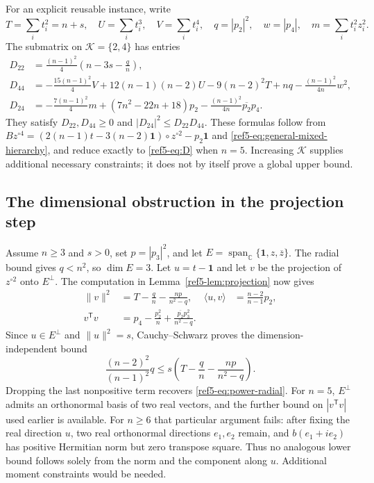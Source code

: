 \documentclass[11pt]{article}
\theoremstyle{remark}
\newcommand{\C}{\mathbb C}
\newcommand{\one}{\mathbf 1}
\newcommand{\norm}[1]{\lVert#1\rVert}
\newcommand{\ip}[2]{\langle#1,#2\rangle}
\numberwithin{equation}{section}
\begin{document}
For an explicit reusable instance, write
\[
 T=\sum_i t_i^2=n+s,\quad U=\sum_i t_i^3,\quad V=\sum_i t_i^4,
 \quad q=|p_2|^2,\quad w=|p_4|,\quad m=\sum_i t_i^2z_i^2.
\]
The submatrix on $\mathcal K=\{2,4\}$ has entries
\begin{equation}\label{ref5-eq:general-D24}
\begin{aligned}
 D_{22}&=\frac{(n-1)^2}{4}\left(n-3s-\frac qn\right),\\
 D_{44}&=-\frac{15(n-1)^2}{4}V+12(n-1)(n-2)U
       -9(n-2)^2T+nq-\frac{(n-1)^2}{4n}w^2,\\
 D_{24}&=-\frac{7(n-1)^2}{4}m+(7n^2-22n+18)p_2
       -\frac{(n-1)^2}{4n}\overline{p_2}p_4.
\end{aligned}
\end{equation}
They satisfy $D_{22},D_{44}\ge0$ and
$|D_{24}|^2\le D_{22}D_{44}$.
These formulas follow from
$Bz^{\circ4}=(2(n-1)t-3(n-2)\one)\circ z^{\circ2}-p_2\one$
and \eqref{ref5-eq:general-mixed-hierarchy}, and reduce exactly to
\eqref{ref5-eq:D} when $n=5$. Increasing $\mathcal K$ supplies additional
necessary constraints; it does not by itself prove a global upper bound.

\subsection{The dimensional obstruction in the projection step}
Assume $n\ge3$ and $s>0$, set $p=|p_3|^2$, and let
$E=\operatorname{span}_{\C}\{\one,z,\overline z\}$.
The radial bound gives $q<n^2$, so $\dim E=3$.
Let $u=t-\one$ and let $v$ be the projection of $z^{\circ2}$ onto
$E^\perp$. The computation in Lemma~\ref{ref5-lem:projection} now gives
\begin{equation}\label{ref5-eq:general-projection-identities}
\begin{aligned}
 \norm v^2&=T-\frac qn-\frac{np}{n^2-q},&
 \ip u v&=\frac{n-2}{n-1}p_2,\\
 v^{\mathsf T}v&=p_4-\frac{p_2^2}{n}
                  +\frac{\overline{p_2}p_3^2}{n^2-q}.
\end{aligned}
\end{equation}
Since $u\in E^\perp$ and $\norm u^2=s$, Cauchy--Schwarz proves the
dimension-independent bound
\begin{equation}\label{ref5-eq:general-projection-CS}
 \frac{(n-2)^2}{(n-1)^2}q
 \le s\left(T-\frac qn-\frac{np}{n^2-q}\right).
\end{equation}
Dropping the last nonpositive term recovers \eqref{ref5-eq:power-radial}.
For $n=5$, $E^\perp$ admits an orthonormal basis of two real vectors,
and the further
bound on $|v^{\mathsf T}v|$ used earlier is available.
For $n\ge6$ that particular argument fails: after fixing the real
direction $u$, two real orthonormal directions $e_1,e_2$ remain, and
$b(e_1+i e_2)$ has positive Hermitian norm but zero transpose square.
Thus no analogous lower bound follows solely from the norm and the
component along $u$. Additional moment constraints would be needed.
\end{document}
